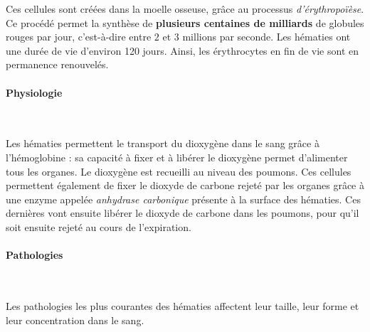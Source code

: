 \documentclass[12pt]{article}
\begin{document}
	Ces cellules sont créées dans la moelle osseuse, grâce au processus \textit{d'érythropoïèse}. Ce procédé permet la synthèse de \textbf{plusieurs centaines de milliards} de globules rouges par jour, c'est-à-dire entre $2$ et $3$ millions par seconde. Les hématies ont une durée de vie d'environ 120 jours. Ainsi, les érythrocytes en fin de vie sont en permanence renouvelés.
	
		\paragraph{Physiologie}\mbox{~}
		
	Les hématies permettent le transport du dioxygène dans le sang grâce à l'hémoglobine : sa capacité à fixer et à libérer le dioxygène permet d'alimenter tous les organes. Le dioxygène est recueilli au niveau des poumons. Ces cellules permettent également de fixer le dioxyde de carbone rejeté par les organes grâce à une enzyme appelée \textit{anhydrase carbonique} présente à la surface des hématies. Ces dernières vont ensuite libérer le dioxyde de carbone dans les poumons, pour qu'il soit ensuite rejeté au cours de l'expiration.
	
		\paragraph{Pathologies}\mbox{~}
		
	Les pathologies les plus courantes des hématies affectent leur taille, leur forme et leur concentration dans le sang.
	
\end{document}
